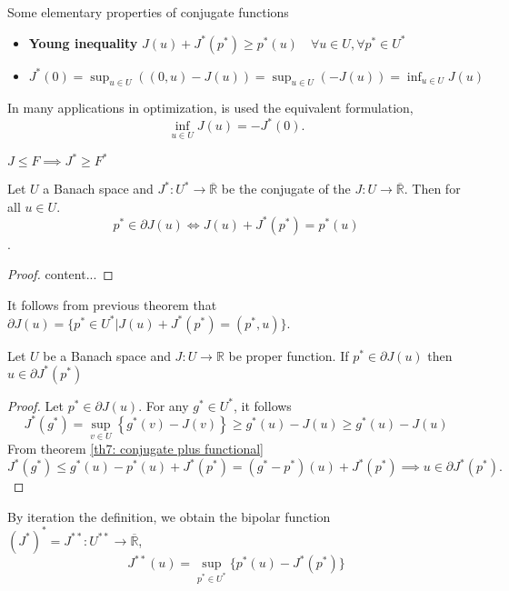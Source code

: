 \begin{remark}
Some elementary properties of conjugate functions
\begin{itemize}
	\item  \textbf{Young inequality} $J(u)+J^*(p^*)\geq p^*(u) \quad \forall u \in U, \forall p^* \in U^*$
	\item  $J^*(0)=\sup_{u\in U}\left((0,u)-J(u)\right)=\sup_{u\in U}\left(-J(u)\right)=\inf_{u\in U}J(u)$
\end{itemize}
In many applications in optimization, is used the equivalent formulation,
\[
\inf_{u\in U}J(u)=-J^*(0).
\]
\end{remark}
$J\leq F \implies J^*\geq F^*$

\begin{theorem}
	Let $U$ a Banach space and $J^*: U^* \rightarrow \overline{\mathbb{R}}$ be the conjugate of the $J:U\rightarrow \overline{\mathbb{R}}$. Then for all $u\in U$. \[p^* \in \partial J(u) \iff J(u)+J^*(p^*)=p^*(u)\]. \label{th7: conjugate plus functional}
	\begin{proof}
		content...
	\end{proof}
\end{theorem}
\begin{corollary}
	It follows from previous theorem that $\partial J(u)=\lbrace p^* \in U^* | J(u)+J^*(p^*)=(p^*, u)\rbrace$.
\end{corollary}
\begin{theorem}
	Let $U$ be a Banach space and $J:U\rightarrow \mathbb{R}$ be proper function. If $p^* \in \partial J(u)$ then $u\in \partial J^* (p^*)$
	\begin{proof}
		Let $p^*\in \partial J(u)$. For any $g^* \in U^*$, it follows \[J^*(g^*)=\sup_{v\in U} \left\lbrace
		g^*(v)-J(v)\right\rbrace\geq g^*(u)-J(u)\geq g^*(u)-J(u)\]
		From theorem \ref{th7: conjugate plus functional} 
		\[
		J^*(g^*)\leq g^*(u)-p^*(u)+J^*(p^*) = \left(g^* - p^* \right)(u)+J^*(p^*)\implies u\in \partial J^*(p^*).
		\]
	\end{proof}
\end{theorem}
By iteration the definition, we obtain the bipolar function
$(J^*)^*=J^{**}: U^{**}\rightarrow \overline{\mathbb{R}}$, 
\[
	J^{**}(u)=\sup_{p^*\in U^*} \lbrace p^*(u)-J^*(p^*) \rbrace
\]


